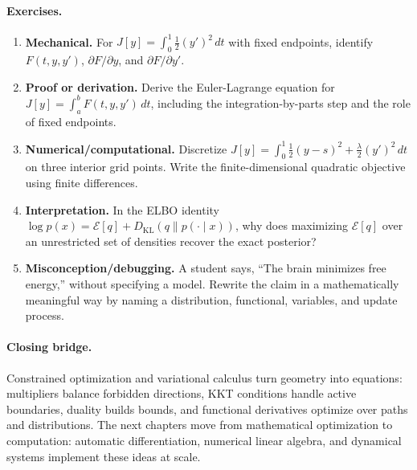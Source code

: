 \paragraph{Exercises.}
\begin{enumerate}[label=\textbf{22.4.\arabic*.}, leftmargin=*]
\item \textbf{Mechanical.} For \(J[y]=\int_0^1 \frac12(y')^2\,dt\) with fixed endpoints, identify \(F(t,y,y')\), \(\partial F/\partial y\), and \(\partial F/\partial y'\).
\item \textbf{Proof or derivation.} Derive the Euler-Lagrange equation for \(J[y]=\int_a^b F(t,y,y')\,dt\), including the integration-by-parts step and the role of fixed endpoints.
\item \textbf{Numerical/computational.} Discretize \(J[y]=\int_0^1 \frac12(y-s)^2+\frac{\lambda}{2}(y')^2\,dt\) on three interior grid points. Write the finite-dimensional quadratic objective using finite differences.
\item \textbf{Interpretation.} In the ELBO identity \(\log p(x)=\mathcal E[q]+D_{\mathrm{KL}}(q\|p(\cdot\mid x))\), why does maximizing \(\mathcal E[q]\) over an unrestricted set of densities recover the exact posterior?
\item \textbf{Misconception/debugging.} A student says, ``The brain minimizes free energy,'' without specifying a model. Rewrite the claim in a mathematically meaningful way by naming a distribution, functional, variables, and update process.
\end{enumerate}

\paragraph{Closing bridge.}
Constrained optimization and variational calculus turn geometry into equations: multipliers balance forbidden directions, KKT conditions handle active boundaries, duality builds bounds, and functional derivatives optimize over paths and distributions. The next chapters move from mathematical optimization to computation: automatic differentiation, numerical linear algebra, and dynamical systems implement these ideas at scale.

\clearpage
